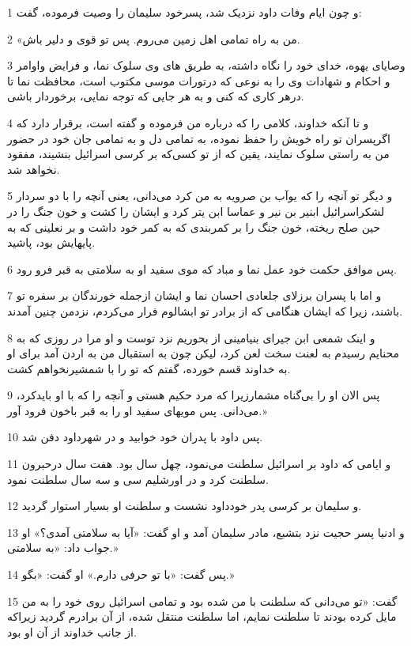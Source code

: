 \par 1 و چون ایام وفات داود نزدیک شد، پسرخود سلیمان را وصیت فرموده، گفت:
\par 2 «من به راه تمامی اهل زمین می‌روم. پس تو قوی و دلیر باش.
\par 3 وصایای یهوه، خدای خود را نگاه داشته، به طریق های وی سلوک نما، و فرایض واوامر و احکام و شهادات وی را به نوعی که درتورات موسی مکتوب است، محافظت نما تا درهر کاری که کنی و به هر جایی که توجه نمایی، برخوردار باشی.
\par 4 و تا آنکه خداوند، کلامی را که درباره من فرموده و گفته است، برقرار دارد که اگرپسران تو راه خویش را حفظ نموده، به تمامی دل و به تمامی جان خود در حضور من به راستی سلوک نمایند، یقین که از تو کسی‌که بر کرسی اسرائیل بنشیند، مفقود نخواهد شد.
\par 5 و دیگر تو آنچه را که یوآب بن صرویه به من کرد می‌دانی، یعنی آنچه را با دو سردار لشکراسرائیل ابنیر بن نیر و عماسا ابن یتر کرد و ایشان را کشت و خون جنگ را در حین صلح ریخته، خون جنگ را بر کمربندی که به کمر خود داشت و بر نعلینی که به پایهایش بود، پاشید.
\par 6 پس موافق حکمت خود عمل نما و مباد که موی سفید او به سلامتی به قبر فرو رود.
\par 7 و اما با پسران برزلای جلعادی احسان نما و ایشان از‌جمله خورندگان بر سفره تو باشند، زیرا که ایشان هنگامی که از برادر تو ابشالوم فرار می‌کردم، نزدمن چنین آمدند.
\par 8 و اینک شمعی ابن جیرای بنیامینی از بحوریم نزد توست و او مرا در روزی که به محنایم رسیدم به لعنت سخت لعن کرد، لیکن چون به استقبال من به اردن آمد برای او به خداوند قسم خورده، گفتم که تو را با شمشیرنخواهم کشت.
\par 9 پس الان او را بی‌گناه مشمارزیرا که مرد حکیم هستی و آنچه را که با او بایدکرد، می‌دانی. پس مویهای سفید او را به قبر باخون فرود آور.»
\par 10 پس داود با پدران خود خوابید و در شهرداود دفن شد.
\par 11 و ایامی که داود بر اسرائیل سلطنت می‌نمود، چهل سال بود. هفت سال درحبرون سلطنت کرد و در اورشلیم سی و سه سال سلطنت نمود.
\par 12 و سلیمان بر کرسی پدر خودداود نشست و سلطنت او بسیار استوار گردید.
\par 13 و ادنیا پسر حجیت نزد بتشبع، مادر سلیمان آمد و او گفت: «آیا به سلامتی آمدی؟» او جواب داد: «به سلامتی.»
\par 14 پس گفت: «با تو حرفی دارم.» او گفت: «بگو.»
\par 15 گفت: «تو می‌دانی که سلطنت با من شده بود و تمامی اسرائیل روی خود را به من مایل کرده بودند تا سلطنت نمایم، اما سلطنت منتقل شده، از آن برادرم گردید زیراکه از جانب خداوند از آن او بود.
